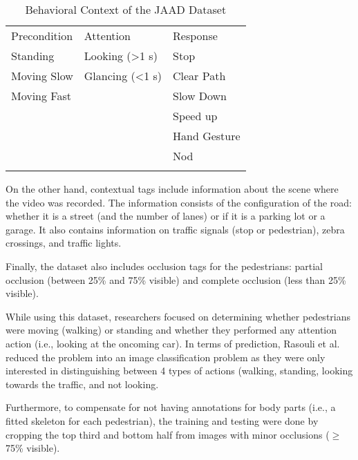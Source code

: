 \documentclass[journal,letterpaper]{IEEEtran}
\begin{document}
\begin{table}[]
\begin{tabular}{lll}
Precondition           & Attention                   & Response                 \\
Standing               & Looking (\textgreater{}1 s) & Stop                     \\
Moving Slow            & Glancing (\textless{}1 s)   & Clear Path               \\
Moving Fast            &                             & Slow Down                \\
                       &                             & Speed up                 \\
                       &                             & Hand Gesture             \\ \hline
\multicolumn{1}{|l|}{} & \multicolumn{1}{l|}{}       & \multicolumn{1}{l|}{Nod} \\ \hline
\multicolumn{1}{|l|}{} & \multicolumn{1}{l|}{}       & \multicolumn{1}{l|}{}    \\ \hline
\end{tabular}
\caption{Behavioral Context of the JAAD Dataset}
\end{table}

On the other hand, contextual tags include information about the scene where the video was recorded. The information consists of the configuration of the road: whether it is a street (and the number of lanes) or if it is a parking lot or a garage. It also contains information on traffic signals (stop or pedestrian), zebra crossings, and traffic lights.

Finally, the dataset also includes occlusion tags for the pedestrians: partial occlusion (between 25\% and 75\% visible) and complete occlusion (less than 25\% visible).

While using this dataset, researchers focused on determining whether pedestrians were moving (walking) or standing and whether they performed any attention action (i.e., looking at the oncoming car). In terms of prediction, Rasouli et al. reduced the problem into an image classification problem as they were only interested in distinguishing between 4 types of actions (walking, standing, looking towards the traffic, and not looking.

Furthermore, to compensate for not having annotations for body parts (i.e., a fitted skeleton for each pedestrian), the training and testing were done by cropping the top third and bottom half from images with minor occlusions ($\ge$ 75\% visible).
\end{document}
